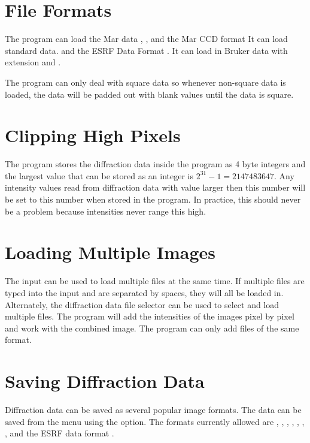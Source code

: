 \section{File Formats}

The program can load the Mar data , 
, and the  Mar CCD format
It can load standard  data. 
and the ESRF Data Format .
It can load in Bruker data with extension 
 and .


The program can only deal with square data so whenever non-square
data is loaded, the data will be padded out with blank values
until the data is square.

\section{Clipping High Pixels}

The program stores the diffraction data inside the program as 4 byte integers and 
the largest value that can be stored as an integer is $2^31-1 = 2147483647$.
Any intensity values read from diffraction data with value larger then 
this number will be set to this number when stored in the program. In practice, 
this should never be a problem because intensities never range this high.

\section{Loading Multiple Images}

The  input can be used to load multiple files
at the same time.
If multiple files are typed into the  input and
are separated by spaces, they will all be loaded in. 
Alternately, the diffraction data file 
selector can be used to select and load multiple files.
The program will add the intensities of the images pixel by pixel 
and work with the combined image. The program can only add files 
of the same format.

\section{Saving Diffraction Data}

Diffraction data can be saved as several popular image formats. 
The data can be saved from the  menu using 
the  option. The formats currently allowed are , 
, , , , , , and 
the ESRF data format .

